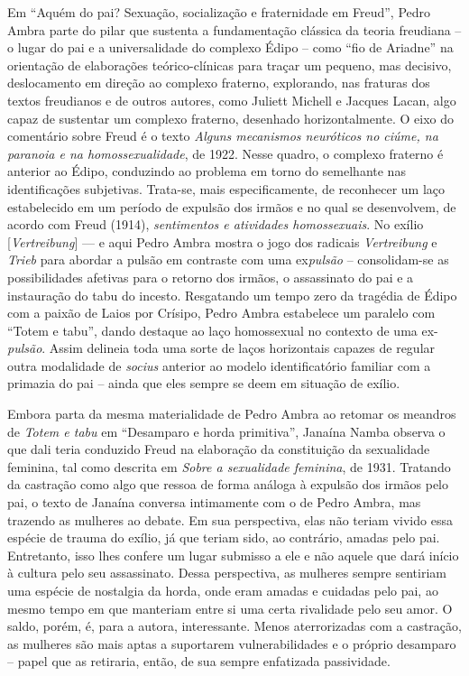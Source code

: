 Em ``Aquém do pai? Sexuação, socialização e fraternidade em Freud'',
Pedro Ambra parte do pilar que sustenta a fundamentação clássica da
teoria freudiana -- o lugar do pai e a universalidade do complexo Édipo
-- como ``fio de Ariadne'' na orientação de elaborações teórico-clínicas
para traçar um pequeno, mas decisivo, deslocamento em direção ao
complexo fraterno, explorando, nas fraturas dos textos freudianos e de
outros autores, como Juliett Michell e Jacques Lacan, algo capaz de
sustentar um complexo fraterno, desenhado horizontalmente. O eixo do
comentário sobre Freud é o texto \emph{Alguns mecanismos neuróticos no
ciúme, na paranoia e na homossexualidade}, de 1922. Nesse quadro, o
complexo fraterno é anterior ao Édipo, conduzindo ao problema em torno
do semelhante nas identificações subjetivas. Trata-se, mais
especificamente, de reconhecer um laço estabelecido em um período de
expulsão dos irmãos e no qual se desenvolvem, de acordo com Freud
(1914), \emph{sentimentos e atividades homossexuais}. No exílio
{[}\emph{Vertreibung}{]} --- e aqui Pedro Ambra mostra o jogo dos
radicais \emph{Vertreibung} e \emph{Trieb} para abordar a pulsão em
contraste com uma ex\emph{pulsão} -- consolidam-se as possibilidades
afetivas para o retorno dos irmãos, o assassinato do pai e a instauração
do tabu do incesto. Resgatando um tempo zero da tragédia de Édipo com a
paixão de Laios por Crísipo, Pedro Ambra estabelece um paralelo com
``Totem e tabu'', dando destaque ao laço homossexual no contexto de uma
ex-\emph{pulsão}. Assim delineia toda uma sorte de laços horizontais
capazes de regular outra modalidade de \emph{socius} anterior ao modelo
identificatório familiar com a primazia do pai -- ainda que eles sempre
se deem em situação de exílio.

Embora parta da mesma materialidade de Pedro Ambra ao retomar os
meandros de \emph{Totem e tabu} em ``Desamparo e horda primitiva'',
Janaína Namba observa o que dali teria conduzido Freud na elaboração da
constituição da sexualidade feminina, tal como descrita em \emph{Sobre a
sexualidade feminina}, de 1931. Tratando da castração como algo que
ressoa de forma análoga à expulsão dos irmãos pelo pai, o texto de
Janaína conversa intimamente com o de Pedro Ambra, mas trazendo as
mulheres ao debate. Em sua perspectiva, elas não teriam vivido essa
espécie de trauma do exílio, já que teriam sido, ao contrário, amadas
pelo pai. Entretanto, isso lhes confere um lugar submisso a ele e não
aquele que dará início à cultura pelo seu assassinato. Dessa
perspectiva, as mulheres sempre sentiriam uma espécie de nostalgia da
horda, onde eram amadas e cuidadas pelo pai, ao mesmo tempo em que
manteriam entre si uma certa rivalidade pelo seu amor. O saldo, porém,
é, para a autora, interessante. Menos aterrorizadas com a castração, as
mulheres são mais aptas a suportarem vulnerabilidades e o próprio
desamparo -- papel que as retiraria, então, de sua sempre enfatizada
passividade.

